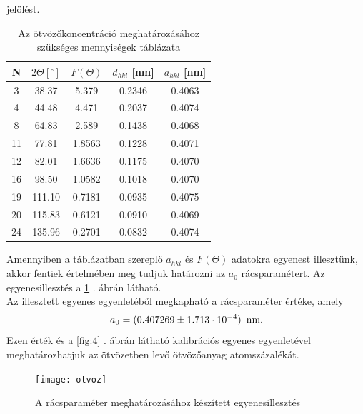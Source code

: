 \documentclass[12pt,a4paper]{article}
\begin{document}
jelölést. \\
\begin{table}[!h]
\begin{center}
\begin{tabular}{|c|c|c|c|c|}
\hline
N & $2\Theta [^{\circ}]$ & $F(\Theta)$ & $d_{hkl}$ [nm] & $a_{hkl}$ [nm]  \\
\hline
3 & 38.37 & 5.379 & 0.2346 & 0.4063\\
\hline
4 & 44.48 & 4.471 & 0.2037 & 0.4074\\
\hline
8 & 64.83 & 2.589 & 0.1438 & 0.4068\\
\hline
11 & 77.81 & 1.8563 & 0.1228 & 0.4071\\
\hline
12 & 82.01 & 1.6636 & 0.1175 & 0.4070\\
\hline
16 & 98.50 & 1.0582 & 0.1018 & 0.4070\\
\hline
19 & 111.10 & 0.7181 & 0.0935 & 0.4075\\
\hline
20 & 115.83 & 0.6121 & 0.0910 & 0.4069\\
\hline
24 & 135.96 & 0.2701 & 0.0832 & 0.4074\\
\hline
\end{tabular}
\caption{Az ötvözőkoncentráció meghatározásához szükséges mennyiségek táblázata}
\label{tab:2}
\end{center}
\end{table}
\newline
Amennyiben a táblázatban szereplő $a_{hkl}$ és $F(\Theta)$ adatokra egyenest illesztünk, akkor fentiek értelmében meg tudjuk határozni az $a_0$ rácsparamétert. Az egyenesillesztés a \ref{fig:3} . ábrán látható.\\
\hspace*{10pt} Az illesztett egyenes egyenletéből megkapható a rácsparaméter értéke, amely 
$$ a_0 = (0.407269 \pm 1.713 \cdot 10^{-4}) \hspace*{5pt} \textrm{nm} .$$ Ezen érték és a \ref{fig:4} . ábrán látható kalibrációs egyenes egyenletével meghatározhatjuk az ötvözetben levő ötvözőanyag atomszázalékát.
\newpage
\begin{figure}[!h]
\hspace*{-0.5cm}
\texttt{[image: otvoz]}
\caption{A rácsparaméter meghatározásához készített egyenesillesztés}
\label{fig:3}
\end{figure}
\end{document}
